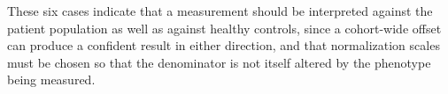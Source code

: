 These six cases indicate that a measurement should be interpreted against the
patient population as well as against healthy controls, since a cohort-wide offset
can produce a confident result in either direction, and that normalization scales
must be chosen so that the denominator is not itself altered by the phenotype being
measured.
